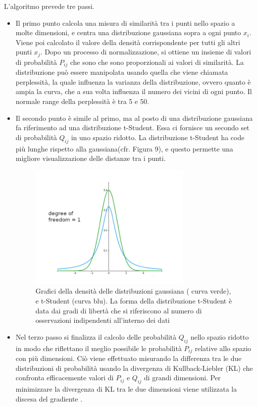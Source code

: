 \documentclass[12pt,italian]{report}
\begin{document}
L'algoritmo prevede tre passi.
\begin{itemize}
	\item Il primo punto calcola una misura di similarità tra i punti nello spazio a molte dimensioni, e centra una distribuzione gaussiana sopra a ogni punto $x_i$. Viene poi calcolato il valore della densità corrispondente per tutti gli altri punti $x_j$. Dopo un processo di normalizzazione, si ottiene un insieme di valori di probabilità $P_{ij}$ che sono che sono proporzionali ai valori di similarità. La distribuzione può essere manipolata usando quella che viene chiamata perplessità, la quale influenza la varianza della distribuzione, ovvero quanto è ampia la curva, che a sua volta influenza  il numero dei vicini di ogni punto. Il normale range della perplessità è tra 5 e 50.
	\item Il secondo punto è simile al primo, ma al posto di una distribuzione gaussiana fa riferimento ad una distribuzione t-Student. Essa ci fornisce un secondo set di probabilità $Q_{ij}$ in uno spazio ridotto. La distribuzione t-Student ha code più lunghe rispetto alla gaussiana(cfr. Figura 9), e questo permette una migliore visualizzazione delle distanze tra i punti.
	
	\begin{figure}[h]
		\centering
		\includegraphics[width = 79mm]{immagini/t-dist1}
		\caption{Grafici della densità delle distribuzioni gaussiana ( curva verde), e t-Student (curva blu). La forma della distribuzione t-Student è data dai gradi di libertà che si riferiscono al numero di osservazioni indipendenti all'interno dei dati}
	\end{figure}
	\item Nel terzo passo si finalizza il calcolo delle probabilità $Q_{ij}$ nello spazio ridotto in modo che riflettano il meglio possibile le probabilità $P_{ij}$ relative allo spazio con più dimensioni. Ciò viene effettuato misurando la differenza tra le due distribuzioni di probabilità usando la divergenza di Kullback-Liebler (KL) che confronta efficacemente valori di $P_{ij}$ e $Q_{ij}$ di grandi dimensioni. Per minimizzare la divergenza di KL tra le due dimensioni viene utilizzata la discesa del gradiente \cite{t-SNE}.
\end{itemize}
\end{document}
